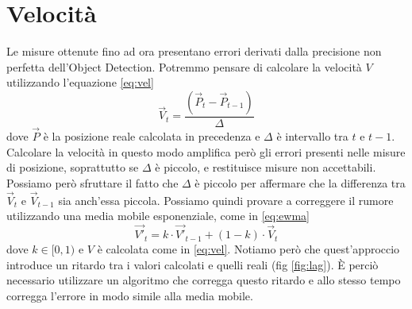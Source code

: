 \chapter{Velocità}
\label{sec:velocita}

Le misure ottenute fino ad ora presentano errori derivati dalla precisione non perfetta dell'Object Detection.
Potremmo pensare di  calcolare la velocità $V$ utilizzando l'equazione \ref{eq:vel}
\begin{equation}
    \label{eq:vel}
    \vec{V}_t = \frac{(\vec{P}_t - \vec{P}_{t-1})}{\Delta}
\end{equation}
dove $\vec{P}$ è la posizione reale calcolata in precedenza e $\Delta$ è intervallo tra $t$ e $t-1$.
Calcolare la velocità in questo modo amplifica però gli errori presenti nelle misure di posizione, soprattutto se $\Delta$ è piccolo, e restituisce misure non accettabili.
Possiamo però sfruttare il fatto che $\Delta$ è piccolo per affermare che la differenza tra $\vec{V}_t$ e $\vec{V}_{t-1}$ sia anch'essa piccola.
Possiamo quindi provare a correggere il rumore utilizzando una media mobile esponenziale, come in \ref{eq:ewma}
\begin{equation}
    \label{eq:ewma}
    \vec{V'}_t = k \cdot \vec{V'}_{t-1} + (1-k) \cdot \vec{V}_t
\end{equation}
dove $k \in [0, 1)$ e $V$ è calcolata come in \ref{eq:vel}.
Notiamo però che quest'approccio introduce un ritardo tra i valori calcolati e quelli reali (fig \ref{fig:lag}).
È perciò necessario utilizzare un algoritmo che corregga questo ritardo e allo stesso tempo corregga l'errore in modo simile alla media mobile.

